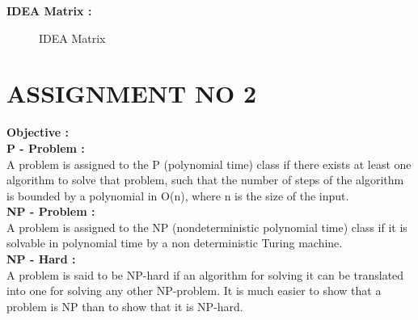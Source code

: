 \documentclass[oneside,a4paper,12pt]{report}
\begin{document}
{\begin{appendices}
\textbf{IDEA Matrix : }

  \begin{center}
	\begin{figure}[H]
		\centering
	  \caption{IDEA Matrix}
	  \label{fig:arch-dig}
	\end{figure}
\end{center} 

\section{ASSIGNMENT NO 2}

\textbf{Objective :} \\

\textbf{P - Problem :} \\
A problem is assigned to the P (polynomial time) class if there exists at least one algorithm to solve that problem, such that the number of steps of the algorithm is bounded by a polynomial in O(n), where n is the size of the input. \\


\textbf{NP - Problem :} \\
A problem is assigned to the NP (nondeterministic polynomial time) class if it is solvable in polynomial time by a non deterministic Turing machine. \\

\textbf{NP - Hard :} \\
A problem is said to be NP-hard if an algorithm for solving it can be translated into one for solving any other NP-problem. It is much easier to show that a problem is NP than to show that it is NP-hard. \\


\end{appendices}}
\end{document}
